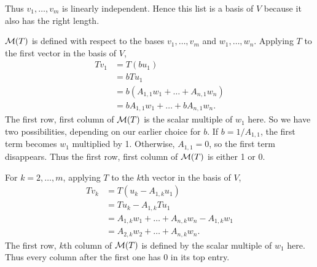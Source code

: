 \documentclass[a5paper]{article}
\begin{document}
    Thus $v_1,\dots,v_m$ is linearly independent.
    Hence this list is a basis of $V$ because it also has the right length.

    $\mathcal{M}(T)$ is defined with respect to the bases $v_1,\dots,v_m$ and $w_1,\dots,w_n$.
    Applying $T$ to the first vector in the basis of $V$,
\begin{align*}
        Tv_1 &= T(b u_1) \\
             &= b Tu_1 \\
             &= b (A_{1,1}w_1 + \dots + A_{n,1}w_n) \\
             &= b A_{1,1}w_1 + \dots + b A_{n,1}w_n .
\end{align*}
    The first row, first column of $\mathcal{M}(T)$ is the scalar multiple of $w_1$ here.
    So we have two possibilities, depending on our earlier choice for $b$.
    If $b=1/A_{1,1}$, the first term becomes $w_1$ multiplied by 1.
    Otherwise, $A_{1,1}=0$, so the first term disappears.
    Thus the first row, first column of $\mathcal{M}(T)$ is either 1 or 0.

    For $k=2,\dots,m$, applying $T$ to the $k$th vector in the basis of $V$,
\begin{align*}
        Tv_k &= T(u_k - A_{1,k}u_1) \\
             &= Tu_k - A_{1,k}Tu_1  \\
             &= A_{1,k}w_1 + \dots + A_{n,k}w_n - A_{1,k}w_1 \\
             &= A_{2,k}w_2 + \dots + A_{n,k}w_n .
\end{align*}
    The first row, $k$th column of $\mathcal{M}(T)$ is defined by the scalar multiple of $w_1$ here.
    Thus every column after the first one has 0 in its top entry.
\end{document}
